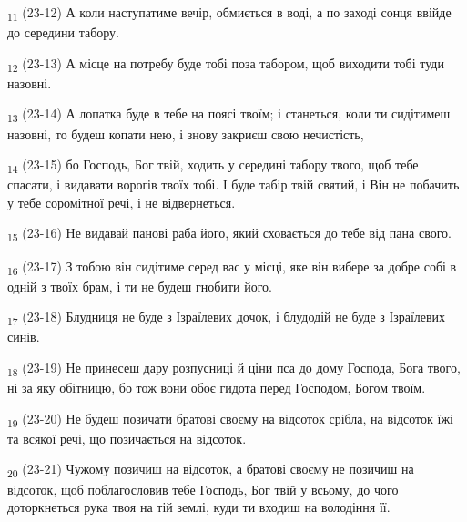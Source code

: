 \begin{tcolorbox}
\textsubscript{11} (23-12) А коли наступатиме вечір, обмиється в воді, а по заході сонця ввійде до середини табору.
\end{tcolorbox}
\begin{tcolorbox}
\textsubscript{12} (23-13) А місце на потребу буде тобі поза табором, щоб виходити тобі туди назовні.
\end{tcolorbox}
\begin{tcolorbox}
\textsubscript{13} (23-14) А лопатка буде в тебе на поясі твоїм; і станеться, коли ти сидітимеш назовні, то будеш копати нею, і знову закриєш свою нечистість,
\end{tcolorbox}
\begin{tcolorbox}
\textsubscript{14} (23-15) бо Господь, Бог твій, ходить у середині табору твого, щоб тебе спасати, і видавати ворогів твоїх тобі. І буде табір твій святий, і Він не побачить у тебе соромітної речі, і не відвернеться.
\end{tcolorbox}
\begin{tcolorbox}
\textsubscript{15} (23-16) Не видавай панові раба його, який сховається до тебе від пана свого.
\end{tcolorbox}
\begin{tcolorbox}
\textsubscript{16} (23-17) З тобою він сидітиме серед вас у місці, яке він вибере за добре собі в одній з твоїх брам, і ти не будеш гнобити його.
\end{tcolorbox}
\begin{tcolorbox}
\textsubscript{17} (23-18) Блудниця не буде з Ізраїлевих дочок, і блудодій не буде з Ізраїлевих синів.
\end{tcolorbox}
\begin{tcolorbox}
\textsubscript{18} (23-19) Не принесеш дару розпусниці й ціни пса до дому Господа, Бога твого, ні за яку обітницю, бо тож вони обоє гидота перед Господом, Богом твоїм.
\end{tcolorbox}
\begin{tcolorbox}
\textsubscript{19} (23-20) Не будеш позичати братові своєму на відсоток срібла, на відсоток їжі та всякої речі, що позичається на відсоток.
\end{tcolorbox}
\begin{tcolorbox}
\textsubscript{20} (23-21) Чужому позичиш на відсоток, а братові своєму не позичиш на відсоток, щоб поблагословив тебе Господь, Бог твій у всьому, до чого доторкнеться рука твоя на тій землі, куди ти входиш на володіння її.
\end{tcolorbox}
